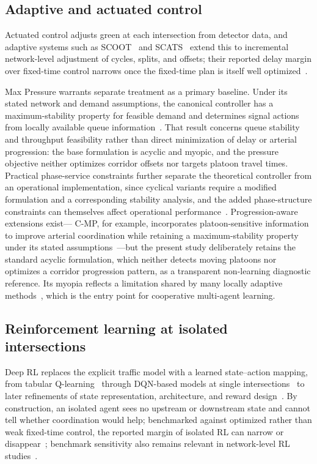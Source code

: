 \documentclass[review,12pt]{elsarticle}
\begin{document}
\subsection{Adaptive and actuated control}
\label{subsec:lit_adaptive}

Actuated control adjusts green at each intersection from detector data, and adaptive systems such as SCOOT~\cite{hunt1981traffic} and SCATS~\cite{sims1980scoot} extend this to incremental network-level adjustment of cycles, splits, and offsets; their reported delay margin over fixed-time control narrows once the fixed-time plan is itself well optimized~\cite{cameronkergaye2010}.

Max Pressure warrants separate treatment as a primary baseline. Under its
stated network and demand assumptions, the canonical controller has a
maximum-stability property for feasible demand and determines signal
actions from locally available queue information~\cite{varaiya2013max}.
That result concerns queue stability and throughput feasibility rather
than direct minimization of delay or arterial progression: the base
formulation is acyclic and myopic, and the pressure objective neither
optimizes corridor offsets nor targets platoon travel times. Practical
phase-service constraints further separate the theoretical controller
from an operational implementation, since cyclical variants require a
modified formulation and a corresponding stability analysis, and the
added phase-structure constraints can themselves affect operational
performance~\cite{levin2020max}. Progression-aware extensions exist---
C-MP, for example, incorporates platoon-sensitive information to improve
arterial coordination while retaining a maximum-stability property under
its stated assumptions~\cite{ahmed2025cmp}---but the present study
deliberately retains the standard acyclic formulation, which neither
detects moving platoons nor optimizes a corridor progression pattern, as
a transparent non-learning diagnostic reference. Its myopia reflects a
limitation shared by many locally adaptive methods~\cite{mikesmith2011},
which is the entry point for cooperative multi-agent learning.

\subsection{Reinforcement learning at isolated intersections}
\label{subsec:lit_rl_isolated}

Deep RL replaces the explicit traffic model with a learned state--action mapping, from tabular Q-learning~\cite{samaheltantawy2014} through DQN-based models at single intersections~\cite{sangminpark2021,mohammadaslani2018} to later refinements of state representation, architecture, and reward design~\cite{wei2018intellilight,wei2019presslight,chen2020toward}. By construction, an isolated agent sees no upstream or downstream state and cannot tell whether coordination would help; benchmarked against optimized rather than weak fixed-time control, the reported margin of isolated RL can narrow or disappear~\cite{chenouyang2024}; benchmark sensitivity also remains relevant in network-level RL studies~\cite{noaeen2022reinforcement}.
\end{document}
